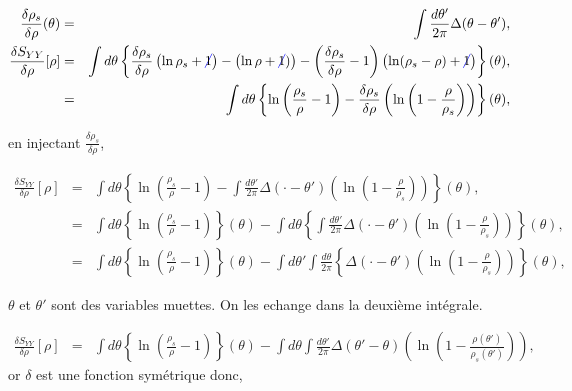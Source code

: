 	\begin{eqnarray}
		\frac{\delta \rho_s }{ \delta \rho } ( \theta ) & = & 	\int  \frac{d \theta ' }{ 2 \pi } \Delta ( \theta - \theta' ), \\
		\frac{ \delta S_{YY} }{ \delta \rho } [\rho ]  & = & \int  d\theta\left \{  \frac{\delta \rho_s }{ \delta \rho } \left ( \ln  \rho_s + {\color{blue} \cancel{ \color{black}1}}  \right ) - \left (  \ln \rho + {\color{blue} \cancel{ \color{black}1}} ) \right )  -  \left ( \frac{\delta \rho_s }{ \delta \rho } - 1 \right ) \left ( \ln ( \rho_s -\rho ) +  {\color{blue} \cancel{ \color{black} 1}}  \right ) \right  \} ( \theta )  ,\\
		& = & \int  d\theta \left \{ \ln \left ( \frac{ \rho_s}{ \rho} - 1 \right ) - \frac{\delta \rho_s }{ \delta \rho } \left ( \ln \left ( 1 - \frac{ \rho}{ \rho_s}\right ) \right ) \right \} ( \theta ) , \\
	\end{eqnarray}
	
	en injectant $\frac{\delta \rho_s }{ \delta \rho }$,
	
	\begin{eqnarray}
		\frac{ \delta S_{YY} }{ \delta \rho } [\rho ]  & = &\int  d\theta\left \{ \ln \left ( \frac{ \rho_s}{ \rho} - 1 \right ) - \int  \frac{d \theta ' }{ 2 \pi } \Delta ( \cdot  - \theta' ) \left ( \ln \left ( 1 - \frac{ \rho}{ \rho_s}\right ) \right ) \right \} ( \theta ) , \\  
		& = &\int  d\theta\left \{ \ln \left ( \frac{ \rho_s}{ \rho} - 1 \right )  \right \} ( \theta ) - \int  d\theta\left \{ \int  \frac{d \theta ' }{ 2 \pi } \Delta ( \cdot  - \theta' ) \left ( \ln \left ( 1 - \frac{ \rho}{ \rho_s}\right ) \right ) \right \} ( \theta ) , \\ 
		& = &\int  d\theta\left \{ \ln \left ( \frac{ \rho_s}{ \rho} - 1 \right )  \right \} ( \theta ) -  \int  d\theta' \int  \frac{d\theta}{2 \pi}  \left \{  \Delta ( \cdot  - \theta' ) \left ( \ln \left ( 1 - \frac{ \rho}{ \rho_s}\right ) \right ) \right \} ( \theta ) ,		
	\end{eqnarray}
	
	$\theta$ et $\theta'$ sont des variables muettes. On les echange dans la deuxième intégrale.
	
	\begin{eqnarray}
		\frac{ \delta S_{YY} }{ \delta \rho } [\rho ]  & = &\int  d\theta\left \{ \ln \left ( \frac{ \rho_s}{ \rho} - 1 \right )  \right \} ( \theta ) -  \int  d\theta    \int  \frac{d\theta'}{2 \pi}  \Delta (   \theta '  - \theta ) \left ( \ln \left ( 1 - \frac{ \rho  ( \theta ')}{ \rho_s  ( \theta ')}\right ) \right )  ,		
	\end{eqnarray}
	or $\delta$ est une fonction symétrique donc, 
	

